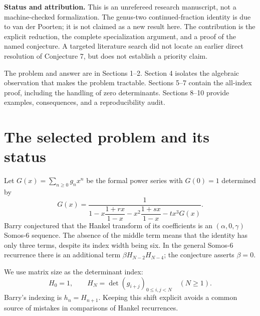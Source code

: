 \documentclass[11pt,a4paper]{article}
\numberwithin{equation}{section}
\theoremstyle{definition}
\begin{document}
\vfill
\begingroup\noindent\small\textbf{Status and attribution.}
This is an unrefereed research manuscript, not a machine-checked formalization.
The genus-two continued-fraction identity is due to van der Poorten; it is not
claimed as a new result here. The contribution is the explicit reduction,
the complete specialization argument, and a proof of the named conjecture.
A targeted literature search did not locate an earlier direct resolution of
Conjecture 7, but does not establish a priority claim.\par\endgroup
\newpage
\tableofcontents
\vspace{0.6cm}
\begin{tcolorbox}[colback=white,colframe=accent,boxrule=0.4pt,title=Reading guide,
 coltitle=white,colbacktitle=accent]
The problem and answer are in Sections 1--2. Section 4 isolates the algebraic
observation that makes the problem tractable. Sections 5--7 contain the
all-index proof, including the handling of zero determinants. Sections 8--10
provide examples, consequences, and a reproducibility audit.
\end{tcolorbox}

\section{The selected problem and its status}

Let $G(x)=\sum_{n\geq0}g_nx^n$ be the formal power series with $G(0)=1$ determined by
\begin{equation}\label{eq:barry}
 G(x)=\frac{1}{1-x\dfrac{1+rx}{1-x}
                    -x^2\dfrac{1+sx}{1-x}-tx^3G(x)}.
\end{equation}
Barry \cite[Conjecture 7, p.~7]{Barry2022} conjectured that the Hankel transform
of its coefficients is an $(\alpha,0,\gamma)$ Somos-6 sequence. The absence of
the middle term means that the identity has only three terms, despite its
index width being six. In the general Somos-6 recurrence there is an
additional term $\beta H_{N-2}H_{N-4}$; the conjecture asserts $\beta=0$.

We use matrix size as the determinant index:
\begin{equation}\label{eq:hdef}
 H_0=1,\qquad H_N=\det(g_{i+j})_{0\leq i,j<N}\quad(N\geq1).
\end{equation}
Barry's indexing is $h_n=H_{n+1}$. Keeping this shift explicit avoids a common
source of mistakes in comparisons of Hankel recurrences.
\end{document}

